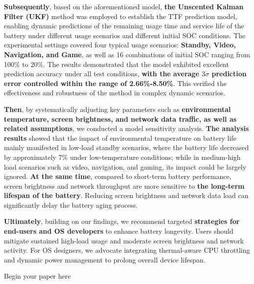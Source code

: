 \documentclass[12pt]{article}
\begin{document}
\textbf{Subsequently}, based on the aforementioned model, \textbf{the Unscented Kalman Filter (UKF)} method was employed to establish the TTF prediction model, enabling dynamic predictions of the remaining usage time and service life of the battery under different usage scenarios and different initial SOC conditions. 
The experimental settings covered four typical usage scenarios: \textbf{Standby, Video, Navigation, and Game}, as well as 16 combinations of initial SOC  ranging from 100\% to 20\%.
The results demonstrated that the model exhibited excellent prediction accuracy under all test conditions,
\textbf{with the average $3\sigma$ prediction error controlled within the range of 2.66\%-8.50\%}.
This verified the effectiveness and robustness of the method in complex dynamic scenarios. 

\textbf{Then}, by systematically adjusting key parameters such as \textbf{environmental temperature, screen brightness, and network data traffic, as well as related assumptions},
we conducted a model sensitivity analysis.
\textbf{The analysis results} showed that the impact of environmental temperature on battery life mainly manifested in low-load standby scenarios,
where the battery life decreased by approximately 7\% under low-temperature conditions;
while in medium-high load scenarios such as video, navigation, and gaming, its impact could be largely ignored.
\textbf{At the same time}, compared to short-term battery performance, screen brightness and network throughput are more sensitive to \textbf{the long-term lifespan of the battery}. 
Reducing screen brightness and network data load can significantly delay the battery aging process. 

\textbf{Ultimately}, building on our findings, we recommend targeted \textbf{strategies for end-users and OS developers} to enhance battery longevity.
 Users should mitigate sustained high-load usage and moderate screen brightness and network activity. For OS designers, we advocate integrating thermal-aware CPU throttling and dynamic power management to prolong overall device lifespan.



\clearpage
\pagestyle{fancy}
\newpage
\setcounter{page}{1}
Begin your paper here



\end{document}
